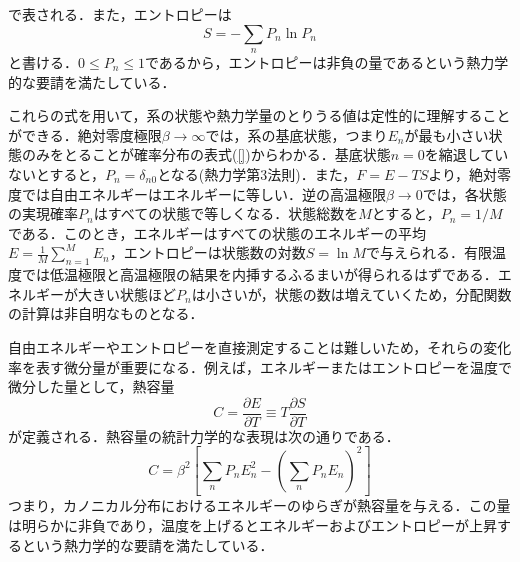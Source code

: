 \documentclass[a4paper,11pt]{jsarticle}
\begin{document}
で表される．また，エントロピーは
\begin{equation}
  S = -\sum_{n} P_n \ln{P_n}
\end{equation}
と書ける．$0 \leq P_n \leq 1$であるから，エントロピーは非負の量であるという熱力学的な要請を満たしている．\par
これらの式を用いて，系の状態や熱力学量のとりうる値は定性的に理解することができる．絶対零度極限$\beta \rightarrow \infty$では，系の基底状態，つまり$E_n$が最も小さい状態のみをとることが確率分布の表式(\ref{})からわかる．基底状態$n=0$を縮退していないとすると，$P_n=\delta_{n0}$となる(熱力学第3法則)．また，$F=E-TS$より，絶対零度では自由エネルギーはエネルギーに等しい．逆の高温極限$\beta \rightarrow 0$では，各状態の実現確率$P_n$はすべての状態で等しくなる．状態総数を$M$とすると，$P_n = 1/M$である．このとき，エネルギーはすべての状態のエネルギーの平均$E=\frac{1}{M}\sum_{n=1}^{M}E_n$，エントロピーは状態数の対数$S=\ln{M}$で与えられる．有限温度では低温極限と高温極限の結果を内挿するふるまいが得られるはずである．エネルギーが大きい状態ほど$P_n$は小さいが，状態の数は増えていくため，分配関数の計算は非自明なものとなる．\par
自由エネルギーやエントロピーを直接測定することは難しいため，それらの変化率を表す微分量が重要になる．例えば，エネルギーまたはエントロピーを温度で微分した量として，熱容量
\begin{equation}
  C = \frac{\partial E}{\partial T} \equiv T \frac{\partial S}{\partial T}
\end{equation}
が定義される．熱容量の統計力学的な表現は次の通りである．
\begin{equation}
  C = \beta^2 \left[ \sum_n P_n E_n^2 - \left( \sum_n P_n E_n \right)^2 \right]
\end{equation}
つまり，カノニカル分布におけるエネルギーのゆらぎが熱容量を与える．この量は明らかに非負であり，温度を上げるとエネルギーおよびエントロピーが上昇するという熱力学的な要請を満たしている．
\end{document}
